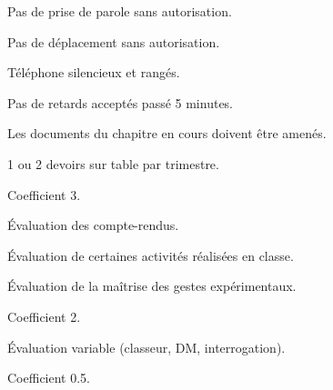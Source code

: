 \newpage
\pasDePagination


\large

\begin{listePoints}
  \item {}
  \item Pas de prise de parole sans autorisation.
  \item Pas de déplacement sans autorisation.
  \item Téléphone silencieux et rangés.
  \item Pas de retards acceptés passé 5 minutes.
  \item Les documents du chapitre en cours doivent  être amenés.
\end{listePoints}

\begin{center}
\end{center}

\vspace*{-0.2cm}
\ligne




\begin{listePoints}
  \item 1 ou 2 devoirs sur table par trimestre.
  \item {}
  \item Coefficient 3.
\end{listePoints}



\begin{listePoints}
  \item Évaluation des compte-rendus.
  \item Évaluation de certaines activités réalisées en classe.
  \item Évaluation de la maîtrise des gestes expérimentaux.
  \item Coefficient 2.
\end{listePoints}



\begin{listePoints}
  \item Évaluation variable (classeur, DM, interrogation).
  \item Coefficient 0.5.
\end{listePoints}


